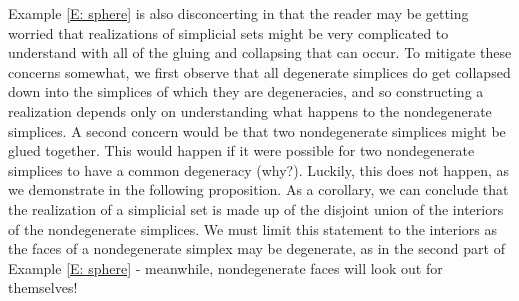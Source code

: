 \documentclass[12pt]{article}
\theoremstyle{plain}
\theoremstyle{definition}
\theoremstyle{remark}
\begin{document}
Example \ref{E: sphere} is also disconcerting in that the reader may be getting worried that realizations of simplicial sets might be very complicated to understand with all of the gluing and collapsing that can occur. To mitigate these concerns somewhat, we first observe that all degenerate simplices do get collapsed down into the simplices of which they are degeneracies, and so constructing a realization depends only on understanding what happens to the nondegenerate simplices. A second concern would be that two nondegenerate simplices might be glued together. This would happen if it were possible for two nondegenerate simplices to have a common degeneracy (why?). Luckily, this does not happen, as we demonstrate in the following proposition. As a corollary, we can conclude that the realization of a simplicial set is made up of the disjoint union of the interiors of the nondegenerate simplices. We must limit this statement to the interiors as the faces of a nondegenerate simplex may be degenerate, as in the second part of Example \ref{E: sphere} - meanwhile, nondegenerate faces will look out for themselves!
\end{document}
